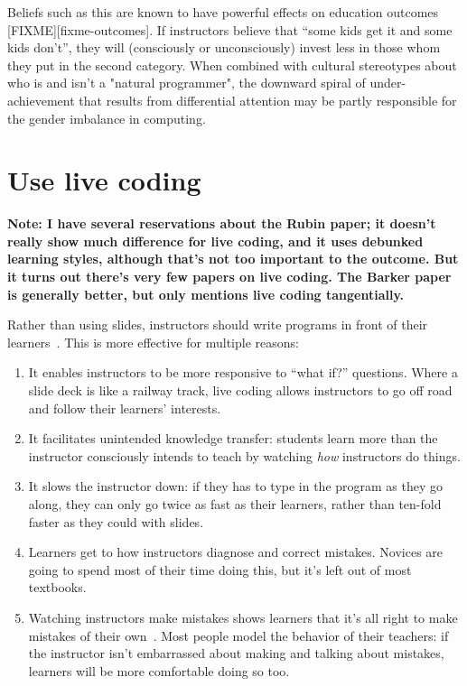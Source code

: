 \documentclass{article}
\begin{document}
Beliefs such as this are known to have powerful effects on education outcomes [FIXME][fixme-outcomes].
If instructors believe that ``some kids get it and some kids don't'',
they will (consciously or unconsciously) invest less in those whom they put in the second category.
When combined with cultural stereotypes about who is and isn't a "natural programmer",
the downward spiral of under-achievement that results from differential attention
may be partly responsible for the gender imbalance in computing.

\section{Use live coding}

\textbf{Note: I have several reservations about the Rubin paper; it doesn't really show much difference for live coding, and it uses debunked learning styles, although that's not too important to the outcome.  But it turns out there's very few papers on live coding.  The Barker paper is generally better, but only mentions live coding tangentially.}

Rather than using slides,
instructors should write programs in front of their learners~\cite{rubin-live-coding}.
This is more effective for multiple reasons:

\begin{enumerate}
\item It enables instructors to be more responsive to ``what if?''
    questions. Where a slide deck is like a railway track, live coding
    allows instructors to go off road and follow their learners'
    interests.

\item  It facilitates unintended knowledge transfer: students learn more
    than the instructor consciously intends to teach by watching \textit{how}
    instructors do things.

\item  It slows the instructor down: if they has to type in the program
    as they go along, they can only go twice as fast as their
    learners, rather than ten-fold faster as they could with slides.

\item  Learners get to how instructors diagnose and correct
    mistakes. Novices are going to spend most of their time doing
    this, but it's left out of most textbooks.

\item  Watching instructors make mistakes shows learners that it's all
    right to make mistakes of their own~\citep{barker-live-coding}.  Most people model the
    behavior of their teachers: if the instructor isn't embarrassed
    about making and talking about mistakes, learners will be more
    comfortable doing so too.
\end{enumerate}
\end{document}
